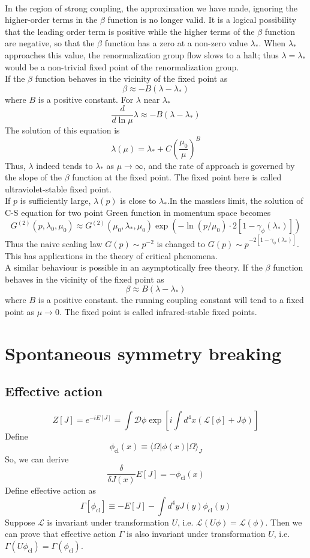 \\
In the region of strong coupling, the approximation we have made, ignoring the higher-order terms in the $\beta$ function is no longer valid. It is a logical possibility that the leading order term is positive while the higher terms of the $\beta$ function are negative, so that the $\beta$ function has a zero at a non-zero value $\lambda_*$. When $\lambda_*$ approaches this value, the renormalization group flow slows to a halt; thus $\lambda = \lambda_*$ would be a non-trivial fixed point of the renormalization group. 
\\
If the $\beta$ function behaves in the vicinity of the fixed point as 
\[\beta \approx -B(\lambda - \lambda_*)\] 
where $B$ is a positive constant. For $\lambda$ near $\lambda_*$ 
\[\frac{d}{d\ln \mu} \lambda \approx -B(\lambda-\lambda_*)\]
The solution of this equation is
\[\lambda(\mu) = \lambda_* + C(\frac{\mu_0}{\mu})^B\]
Thus, $\lambda$ indeed tends to $\lambda_*$ as $\mu \to \infty$, and the rate of approach is governed by the slope of the $\beta$ function at the fixed point. The fixed point here is called ultraviolet-stable fixed point. 
\\
If $p$ is sufficiently large, $\lambda(p)$ is close to $\lambda_*$.In the massless limit, the solution of C-S equation for two point Green function in momentum space becomes
\[G^{(2)}(p,\lambda_0,\mu_0) \approx G^{(2)}(\mu_0,\lambda_*,\mu_0)\exp \left (- \ln(p/\mu_0) \cdot 2[1-\gamma_{\phi}(\lambda_*)] \right )\]
Thus the naive scaling law $G(p) \sim p^{-2}$ is changed to $G(p) \sim p^{-2[1-\gamma_{\phi}(\lambda_*)]}$. This has applications in the theory of critical phenomena.
\\
A similar behaviour is possible in an asymptotically free theory. If the $\beta$ function behaves in the vicinity of the fixed point as 
\[\beta \approx B(\lambda - \lambda_*)\] 
where $B$ is a positive constant.
the running coupling constant will tend to a fixed point as $\mu \to 0$.  The fixed point is called infrared-stable fixed points. 

\section{Spontaneous symmetry breaking}
\subsection{Effective action}
\[Z[J] = e^{-iE[J]} = \int \mathcal{D} \phi \exp\left[ i\int d^4x (\mathcal{L}[\phi] + J \phi) \right]\]
Define 
\[\phi_{\mathrm{cl}} (x) \equiv \langle \Omega | \phi(x) | \Omega \rangle_{J}\]
So, we can derive
\[\frac{\delta}{\delta J(x)} E[J] = - \phi_{\mathrm{cl}}(x)\]
Define effective action as
\[\Gamma[\phi_{\mathrm{cl}}] \equiv -E[J] - \int d^4y J(y) \phi_{\mathrm{cl}}(y)\]
Suppose $\mathcal{L}$ is invariant under transformation $U$, i.e. $\mathcal{L}(U\phi) = \mathcal{L}(\phi) $. Then we can prove that effective action $\Gamma$ is also invariant under transformation $U$, i.e. $\Gamma(U\phi_{\mathrm{cl}}) = \Gamma(\phi_{\mathrm{cl}}) $.

